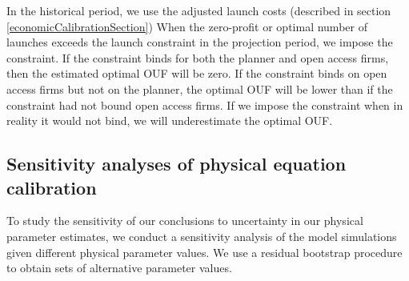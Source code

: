 \documentclass[9pt,twoside,lineno]{pnas-new}
\begin{document}

In the historical period, we use the adjusted launch costs (described in section \ref{economicCalibrationSection}) When the zero-profit or optimal number of launches exceeds the launch constraint in the projection period, we impose the constraint. If the constraint binds for both the planner and open access firms, then the estimated optimal OUF will be zero. If the constraint binds on open access firms but not on the planner, the optimal OUF will be lower than if the constraint had not bound open access firms.  If we impose the constraint when in reality it would not bind, we will underestimate the optimal OUF. \\


\subsection{Sensitivity analyses of physical equation calibration}
\label{physicsSensitivity}

To study the sensitivity of our conclusions to uncertainty in our physical parameter estimates, we conduct a sensitivity analysis of the model simulations given different physical parameter values. We use a residual bootstrap procedure to obtain sets of alternative parameter values. \\
\end{document}
